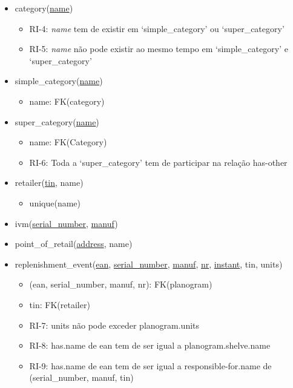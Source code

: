 \documentclass{article}
\newcommand{\bpoint}{\item[$\bullet$]}
\newenvironment{myitemize}
{ \begin{itemize}
    \setlength{\itemsep}{5pt}
    \setlength{\parskip}{0pt}
    \setlength{\parsep}{0pt}     }
{ \end{itemize}                  }
\begin{document}
\begin{myitemize}
		\vspace{2mm}

	 	\item[]{category(\underline{name})}
		\begin{myitemize}
			\bpoint RI-4: \textit{name} tem de existir em `simple\_category' ou `super\_category'
			\bpoint RI-5: \textit{name} não pode existir ao mesmo tempo em `simple\_category' e `super\_category'
		\end{myitemize}

		\vspace{2mm}

	 	\item[] simple\_category(\underline{name})
		\begin{myitemize}
			\bpoint name: FK(category)
		\end{myitemize}

		\vspace{2mm}

	 	\item[] super\_category(\underline{name})
		\begin{myitemize}
			\bpoint name: FK(Category)
			\bpoint RI-6: Toda a `super\_category' tem de participar na relação has-other
		\end{myitemize}

		\vspace{2mm}

	 	\item[] retailer(\underline{tin}, name)
		\begin{myitemize}
			\bpoint unique(name)
		\end{myitemize}

		\vspace{2mm}

		\item[] ivm(\underline{serial\_number}, \underline{manuf})

		\vspace{2mm}

		\item[] point\_of\_retail(\underline{address}, name)

		\vspace{2mm}

	\item[] replenishment\_event(\underline{ean}, \underline{serial\_number}, \underline{manuf}, \underline{nr}, \underline{instant}, tin, units)
		\begin{myitemize}
			\bpoint (ean, serial\_number, manuf, nr): FK(planogram)
			\bpoint tin: FK(retailer)
			\bpoint RI-7: units não pode exceder planogram.units
			\bpoint RI-8: has.name de ean tem de ser igual a planogram.shelve.name
			\bpoint RI-9: has.name de ean tem de ser igual a responsible-for.name de (serial\_number, manuf, tin)


\end{myitemize}
\end{myitemize}
\end{document}

